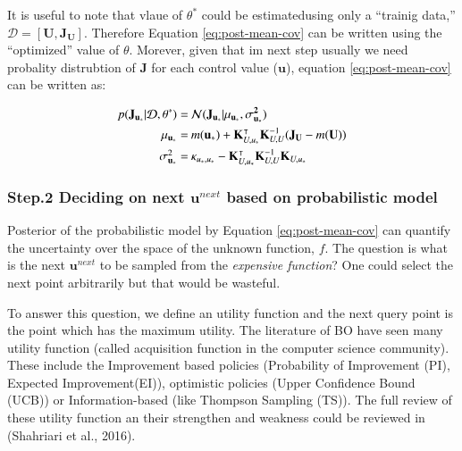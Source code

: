 \documentclass[]{elsarticle} %
\begin{document}
It is useful to note that vlaue of \(\theta^{\ast}\) could be estimatedusing only a ``trainig data,''\(\mathcal{D}=[\mathbf{U},\mathbf{J_U}]\). Therefore Equation \eqref{eq:post-mean-cov} can be written using the ``optimized'' value of \(\theta\). Morever, given that im next step usually we need probality distrubtion of \(\mathbf{J}\) for each control value (\(\mathbf{u}\)), equation \eqref{eq:post-mean-cov} can be written as:

\begin{align}
  \begin{split}
p(\mathbf{J_{u_*}}|\mathbf{\mathcal{D},\theta^\ast})= & \:  \mathcal{N}(\mathbf{J_{u_*}}| \mathbf{\mu_{u_\ast}}, \mathbf{\sigma^2_{u_{\ast}}}) \\
\mathbf{\mu_{u_\ast}}= & \:  m(\mathbf{u_\ast}) +\mathbf{K}^\intercal_{U,u_*} \mathbf{K}^{-1}_{U,U}(\mathbf{J_U}-m(\mathbf{U})) \\
\textstyle \sigma^2_{\mathbf{u_{\ast}}}=& \:  \normalsize{\mathbf{\kappa}_{u_\ast,u_\ast}-\mathbf{K}^\intercal_{U,u_\ast}\mathbf{K}_{U,U}^{-1}\mathbf{K}_{U,u_\ast}}
  \end{split}
\label{eq:post-mean-cov-single}
\end{align}

\hypertarget{step.2-deciding-on-next-mathbfunext-based-on-probabilistic-model}{%
\subsubsection{\texorpdfstring{Step.2 Deciding on next \(\mathbf{u}^{next}\) based on probabilistic model}{Step.2 Deciding on next \textbackslash mathbf\{u\}\^{}\{next\} based on probabilistic model}}\label{step.2-deciding-on-next-mathbfunext-based-on-probabilistic-model}}

Posterior of the probabilistic model by Equation \eqref{eq:post-mean-cov} can quantify the uncertainty over the space of the unknown function, \(f\). The question is what is the next \(\mathbf{u}^{next}\) to be sampled from the \emph{expensive function}? One could select the next point arbitrarily but that would be wasteful.

To answer this question, we define an utility function and the next query point is the point which has the maximum utility. The literature of BO have seen many utility function (called acquisition function in the computer science community). These include the Improvement based policies (Probability of Improvement (PI), Expected Improvement(EI)), optimistic policies (Upper Confidence Bound (UCB)) or Information-based (like Thompson Sampling (TS)). The full review of these utility function an their strengthen and weakness could be reviewed in (Shahriari et al., 2016).
\end{document}

